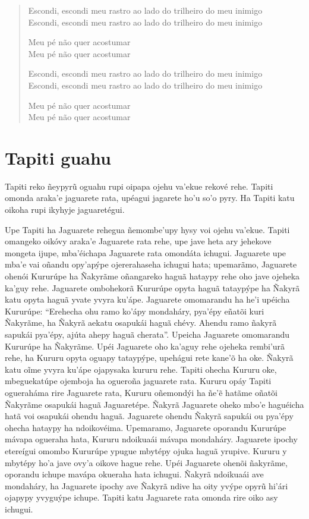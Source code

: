 \begin{verse}
Escondi, escondi meu rastro ao lado do trilheiro do meu inimigo\\
Escondi, escondi meu rastro ao lado do trilheiro do meu inimigo

Meu pé não quer acostumar\\
Meu pé não quer acostumar

Escondi, escondi meu rastro ao lado do trilheiro do meu inimigo\\
Escondi, escondi meu rastro ao lado do trilheiro do meu inimigo

Meu pé não quer acostumar\\
Meu pé não quer acostumar
\end{verse}

\chapter{Tapiti guahu}

Tapiti reko ñeypyrũ oguahu rupi oipapa ojehu va'ekue rekové rehe. Tapiti
omonda araka'e jaguarete rata, upéagui jagarete ho'u so'o pyry. Ha
Tapiti katu oikoha rupi ikyhyje jaguaretégui.

Upe Tapiti ha Jaguarete rehegua ñemombe'upy hysy voi ojehu va'ekue.
Tapiti omangeko oikóvy araka'e Jaguarete rata rehe, upe jave heta ary
jehekove mongeta ijupe, mba'éichapa Jaguarete rata omondáta ichugui.
Jaguarete upe mba'e vai oñandu opy'apýpe ojererahaseha ichugui hata;
upemarãmo, Jaguarete ohenói Kururúpe ha Ñakyrãme oñangareko haguã
hataypy rehe oho jave ojeheka ka'guy rehe. Jaguarete ombohekorã Kururúpe
opyta haguã tataypýpe ha Ñakyrã katu opyta haguã yvate yvyra ku'ápe.
Jaguarete omomarandu ha he'i upéicha Kururúpe: ``Erehecha ohu ramo
ko'ápy mondaháry, pya'épy eñatõi kuri Ñakyrãme, ha Ñakyrã aekatu
osapukái haguã chévy. Ahendu ramo ñakyrã sapukái pya'épy, ajúta ahepy
haguã cherata''. Upeicha Jaguarete omomarandu Kururúpe ha Ñakyrãme. Upéi
Jaguarete oho ka'aguy rehe ojeheka rembi'urã rehe, ha Kururu opyta
oguapy tataypýpe, upehágui rete kane'õ ha oke. Ñakyrã katu oĩme yvyra
ku'ápe ojapysaka kururu rehe. Tapiti ohecha Kururu oke, mbeguekatúpe
ojemboja ha ogueroña jaguarete rata. Kururu opáy Tapiti ogueraháma rire
Jaguarete rata, Kururu oñemondýi ha ñe'ẽ hatãme oñatõi Ñakyrãme osapukái
haguã Jaguaretépe. Ñakyrã Jaguarete oheko mbo'e haguéicha hatã voi
osapukái ohendu haguã. Jaguarete ohendu Ñakyrã sapukái ou pya'épy ohecha
hataypy ha ndoikovéima. Upemaramo, Jaguarete oporandu Kururúpe mávapa
ogueraha hata, Kururu ndoikuaái mávapa mondaháry. Jaguarete ipochy
etereígui omombo Kururúpe ypugue mbytépy ojuka haguã yrupive. Kururu y
mbytépy ho'a jave ovy'a oikove hague rehe. Upéi Jaguarete ohenõi
ñakyrãme, oporandu ichupe mavápa okueraha hata ichugui. Ñakyrã ndoikuaái
ave mondaháry, ha Jaguarete ipochy ave Ñakyrã ndive ha oity yvýpe opyrũ
hi'ári ojapypy yvyguýpe ichupe. Tapiti katu Jaguarete rata omonda rire
oiko asy ichugui.

